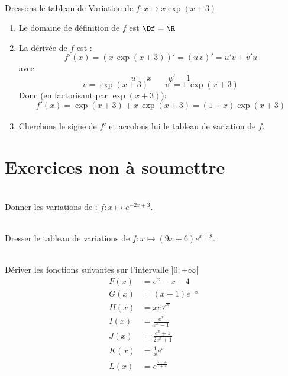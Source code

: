 \documentclass[12pt,fleqn]{report} %
\begin{document}
\begin{example}\text{ }\\
	Dressons le tableau de Variation de $f : x \mapsto x \exp(x+3)$
	\begin{enumerate}
		\item Le domaine de définition de $f$ est $\Df = \R$
		\item La dérivée de $f$ est :
		\[
		f'(x) = \left( x \, \exp(x+3) \right)' = \left( u\, v \right)' = u'v + v'u
		\]
		avec \[
		u = x \qquad u' = 1
		\]
		\[
		v = \exp(x+3) \qquad v' = 1\,\exp(x+3)
		\]
		Donc (en factorisant par $\exp(x+3)$):  \[
		f'(x) = \underline{\exp(x+3)} + x\,\underline{\exp(x+3)} = (1 + x) \exp(x+3)
		\]
		\item Cherchons le signe de $f'$ et accolons lui le tableau de variation de $f$.
		\begin{center}
		\end{center}	
	\end{enumerate}
\end{example}

\chapter*{Exercices non à soumettre}
\begin{exercise}\label{Exercice 10}\text{ }\\
	Donner les variations de : $f : x \mapsto e^{-2x+3}$.
\end{exercise}

\begin{exercise}\label{Exercice 11}\text{ }\\
	Dresser le tableau de variations de $f : x \mapsto (9x+6)e^{x+8}$.
\end{exercise}
\begin{exercise}\label{Exercice 19}\text{ }\\
	Dériver les fonctions suivantes sur l'intervalle $]0;+\infty[$
	\begin{align*}
	F(x)& =e^x-x-4\\
	G(x)& =(x+1)e^{-x}\\
	H(x)& =xe^{\sqrt{x}}\\
	I(x)& =\frac{e^x}{e^x-1}\\
	J(x)& =\frac{e^x+1}{2e^x+1}\\
	K(x)& =\frac{1}{x}e^x\\
	L(x)& =e^{\frac{1-x}{1+x}}\\
	\end{align*}    
\end{exercise}
\end{document}
